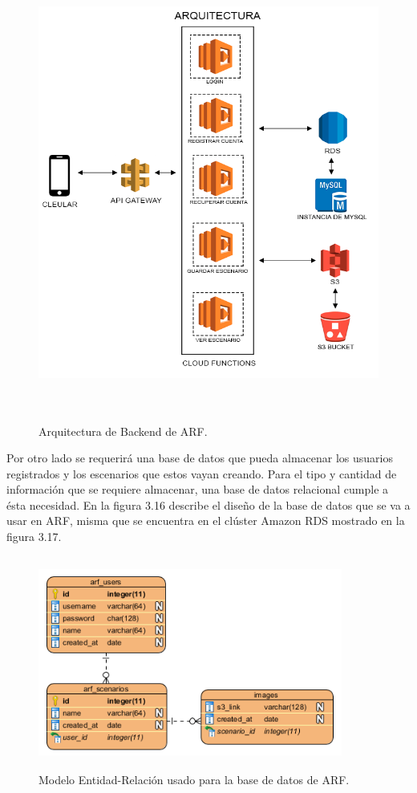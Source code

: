 \begin{figure}[h!]
	\centering
	\includegraphics[width=15cm,height=15cm]{imagenes/desarrollo/arquitectura/ArchitecturaBackend.png}
	\caption{Arquitectura de Backend de ARF.}
	\label{fig:arqbackend}
\end{figure}
\par
Por otro lado se requerirá una base de datos que pueda almacenar los usuarios registrados y los escenarios que estos vayan creando. Para el tipo y cantidad de información que se requiere almacenar, una base de datos relacional cumple a ésta necesidad. En la figura  3.16 describe el diseño de la base de datos que se va a usar en ARF, misma que se encuentra en el clúster Amazon RDS mostrado en la figura 3.17.
\begin{figure}[h!]
	\centering
	\includegraphics[width=10cm,height=7cm]{imagenes/desarrollo/arquitectura/ERD.png}
	\caption{Modelo Entidad-Relación usado para la base de datos de ARF.}
	\label{fig:arqbackend}
\end{figure}


